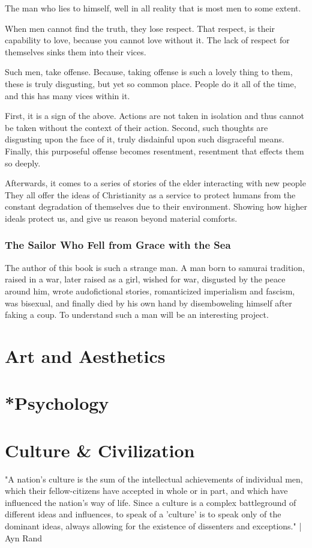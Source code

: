 \par The man who lies to himself, well in all reality that is most men to some extent. 
\par When men cannot find the truth, they lose respect. That respect, is their capability to love, because you cannot love without it. The lack of respect for themselves sinks them into their vices.
\par Such men, take offense. Because, taking offense is such a lovely thing to them, these is truly disgusting, but yet so common place. People do it all of the time, and this has many vices within it. 
\par First, it is a sign of the above. Actions are not taken in isolation and thus cannot be taken without the context of their action. Second, such thoughts are disgusting upon the face of it, truly disdainful upon such disgraceful means. Finally, this purposeful offense becomes resentment, resentment that effects them so deeply.
\\
\par Afterwards, it comes to a series of stories of the elder interacting with new people
 They all offer the ideas of Christianity as a service to protect humans from the constant degradation of themselves due to their environment. Showing how higher ideals protect us, and give us reason beyond material comforts.

\subsection{The Sailor Who Fell from Grace with the Sea}
\par The author of this book is such a strange man. A man born to samurai tradition, raised in a war, later raised as a girl, wished for war, disgusted by the peace around him, wrote audofictional stories, romanticized imperialism and fascism, was bisexual, and finally died by his own hand by disemboweling himself after faking a coup. To understand such a man will be an interesting project.
\\




\chapter{Art and Aesthetics}
\chapter{*Psychology}
\chapter{Culture \& Civilization}
"A nation's culture is the sum of the intellectual achievements of individual men, which their fellow-citizens have accepted in whole or in part, and which have influenced the nation's way of life. Since a culture is a complex battleground of different ideas and influences, to speak of a 'culture' is to speak only of the dominant ideas, always allowing for the existence of dissenters and exceptions." | Ayn Rand
